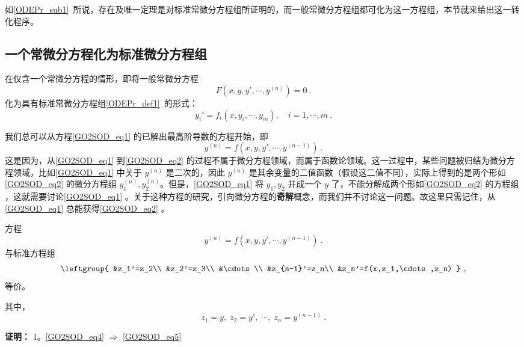 
如\autoref{ODEPr_sub1}~所说，存在及唯一定理是对标准常微分方程组所证明的，而一般常微分方程组都可化为这一方程组，本节就来给出这一转化程序。

\subsection{一个常微分方程化为标准微分方程组}
在仅含一个常微分方程的情形，即将一般常微分方程
\begin{equation}\label{GO2SOD_eq1}
F(x,y,y',\cdots,y^{(n)})=0~.
\end{equation}
化为具有标准常微分方程组\autoref{ODEPr_def1}~的形式：
\begin{equation}\label{GO2SOD_eq3}
y_i'=f_i(x,y_i,\cdots,y_m),\quad i=1,\cdots,m~.
\end{equation}

我们总可以从方程\autoref{GO2SOD_eq1} 的已解出最高阶导数的方程开始，即
\begin{equation}\label{GO2SOD_eq2}
y^{(n)}=f(x,y,y',\cdots,y^{(n-1)})~.
\end{equation}
这是因为，从\autoref{GO2SOD_eq1} 到\autoref{GO2SOD_eq2} 的过程不属于微分方程领域，而属于函数论领域。这一过程中，某些问题被归结为微分方程领域，比如\autoref{GO2SOD_eq1} 中关于 $y^{(n)}$ 是二次的，因此 $y^{(n)}$ 是其余变量的二值函数（假设这二值不同），实际上得到的是两个形如\autoref{GO2SOD_eq2} 的微分方程组 $y_1^{(n)},y_2^{(n)}$。但是，\autoref{GO2SOD_eq1} 将 $y_1,y_2$ 并成一个 $y$ 了，不能分解成两个形如\autoref{GO2SOD_eq2} 的方程组 ，这就需要讨论\autoref{GO2SOD_eq1} 。关于这种方程的研究，引向微分方程的\textbf{奇解}概念，而我们并不讨论这一问题。故这里只需记住，从\autoref{GO2SOD_eq1} 总能获得\autoref{GO2SOD_eq2} 。
\begin{theorem}{}\label{GO2SOD_the1}
方程
\begin{equation}\label{GO2SOD_eq4}
y^{(n)}=f(x,y,y',\cdots,y^{(n-1)})~.
\end{equation}
与标准方程组
\begin{equation}\label{GO2SOD_eq5}
\leftgroup{
&z_1'=z_2\\
&z_2'=z_3\\
&\cdots\\
&z_{n-1}'=z_n\\
&z_n'=f(x,z_1,\cdots,z_n)
}~,
\end{equation}
等价。

其中，
\begin{equation}\label{GO2SOD_eq6}
z_1=y,\;z_2=y',\;\cdots,\;z_n=y^{(n-1)}~.
\end{equation}
\end{theorem}
\textbf{证明：}
1。\autoref{GO2SOD_eq4} $\Rightarrow$ \autoref{GO2SOD_eq5} 

